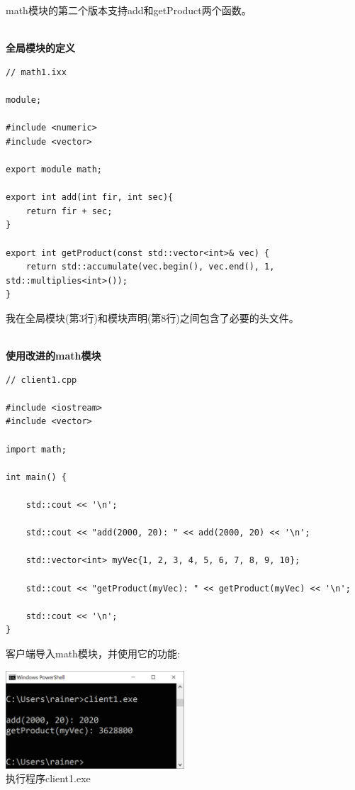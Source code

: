 math模块的第二个版本支持add和getProduct两个函数。

\hspace*{\fill} \\ %
\noindent
\textbf{全局模块的定义}
\begin{lstlisting}[style=styleCXX]
// math1.ixx

module;

#include <numeric>
#include <vector>

export module math;

export int add(int fir, int sec){
	return fir + sec;
}

export int getProduct(const std::vector<int>& vec) {
	return std::accumulate(vec.begin(), vec.end(), 1, std::multiplies<int>());
}
\end{lstlisting}

我在全局模块(第3行)和模块声明(第8行)之间包含了必要的头文件。

\hspace*{\fill} \\ %
\noindent
\textbf{使用改进的math模块}
\begin{lstlisting}[style=styleCXX]
// client1.cpp

#include <iostream>
#include <vector>

import math;

int main() {
	
	std::cout << '\n';
	
	std::cout << "add(2000, 20): " << add(2000, 20) << '\n';
	
	std::vector<int> myVec{1, 2, 3, 4, 5, 6, 7, 8, 9, 10};
	
	std::cout << "getProduct(myVec): " << getProduct(myVec) << '\n';
	
	std::cout << '\n';
}
\end{lstlisting}

客户端导入math模块，并使用它的功能:

\begin{center}
\includegraphics[width=0.5\textwidth]{content/3/chapter4/images/17.png}\\
执行程序client1.exe
\end{center}

